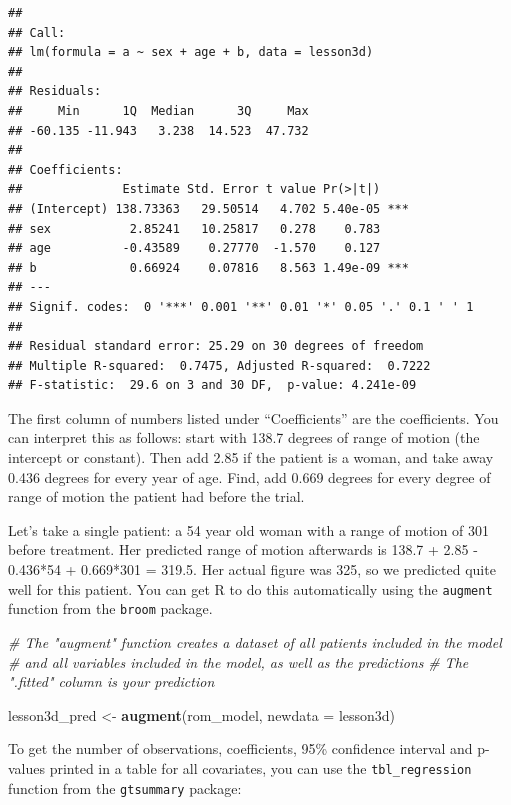 \documentclass[]{book}
\newenvironment{Shaded}{\begin{snugshade}}{\end{snugshade}}
\newcommand{\CommentTok}[1]{\textcolor[rgb]{0.56,0.35,0.01}{\textit{#1}}}
\newcommand{\DataTypeTok}[1]{\textcolor[rgb]{0.13,0.29,0.53}{#1}}
\newcommand{\KeywordTok}[1]{\textcolor[rgb]{0.13,0.29,0.53}{\textbf{#1}}}
\newcommand{\NormalTok}[1]{#1}
\newcommand{\StringTok}[1]{\textcolor[rgb]{0.31,0.60,0.02}{#1}}
\begin{document}
\begin{verbatim}
## 
## Call:
## lm(formula = a ~ sex + age + b, data = lesson3d)
## 
## Residuals:
##     Min      1Q  Median      3Q     Max 
## -60.135 -11.943   3.238  14.523  47.732 
## 
## Coefficients:
##              Estimate Std. Error t value Pr(>|t|)    
## (Intercept) 138.73363   29.50514   4.702 5.40e-05 ***
## sex           2.85241   10.25817   0.278    0.783    
## age          -0.43589    0.27770  -1.570    0.127    
## b             0.66924    0.07816   8.563 1.49e-09 ***
## ---
## Signif. codes:  0 '***' 0.001 '**' 0.01 '*' 0.05 '.' 0.1 ' ' 1
## 
## Residual standard error: 25.29 on 30 degrees of freedom
## Multiple R-squared:  0.7475, Adjusted R-squared:  0.7222 
## F-statistic:  29.6 on 3 and 30 DF,  p-value: 4.241e-09
\end{verbatim}

The first column of numbers listed under ``Coefficients'' are the
coefficients. You can interpret this as follows: start with 138.7
degrees of range of motion (the intercept or constant). Then add 2.85 if
the patient is a woman, and take away 0.436 degrees for every year of
age. Find, add 0.669 degrees for every degree of range of motion the
patient had before the trial.

Let's take a single patient: a 54 year old woman with a range of motion
of 301 before treatment. Her predicted range of motion afterwards is
138.7 + 2.85 - 0.436*54 + 0.669*301 = 319.5. Her actual figure was 325,
so we predicted quite well for this patient. You can get R to do this
automatically using the \texttt{augment} function from the
\texttt{broom} package.

\begin{Shaded}
\begin{Highlighting}[]
\CommentTok{# The "augment" function creates a dataset of all patients included in the model}
\CommentTok{# and all variables included in the model, as well as the predictions}
\CommentTok{# The ".fitted" column is your prediction}

\NormalTok{lesson3d_pred <-}
\StringTok{  }\KeywordTok{augment}\NormalTok{(rom_model,}
          \DataTypeTok{newdata =}\NormalTok{ lesson3d)}
\end{Highlighting}
\end{Shaded}

To get the number of observations, coefficients, 95\% confidence
interval and p-values printed in a table for all covariates, you can use
the \texttt{tbl\_regression} function from the \texttt{gtsummary}
package:
\end{document}

